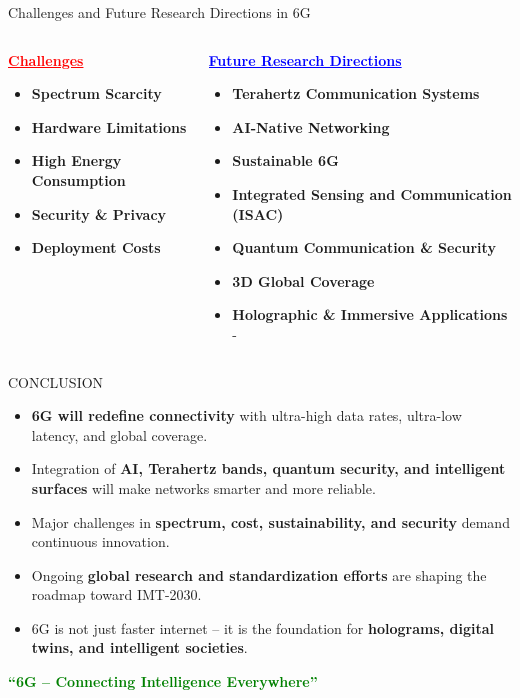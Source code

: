 \documentclass{beamer}
\begin{document}
\begin{frame}{Challenges and Future Research Directions in 6G}
\begin{columns}[T] 

\begin{column}{0.48\textwidth}
 \textcolor{red}{\underline{\textbf{Challenges}}}
\begin{itemize}
    \item \textbf{Spectrum Scarcity} 
    \item \textbf{Hardware Limitations} 
    \item \textbf{High Energy Consumption} 
    \item \textbf{Security \& Privacy} 
    \item \textbf{Deployment Costs} 
\end{itemize}
\end{column}

\begin{column}{0.48\textwidth}
 \textcolor{blue}{\underline{\textbf{Future Research Directions}}}
\begin{itemize}
    \item \textbf{Terahertz Communication Systems}
    \item \textbf{AI-Native Networking} 
    \item \textbf{Sustainable 6G} 
    \item \textbf{Integrated Sensing and Communication (ISAC)} 
    \item \textbf{Quantum Communication \& Security} 
    \item \textbf{3D Global Coverage} 
    \item \textbf{Holographic \& Immersive Applications} -
\end{itemize}
\end{column}
\end{columns}
\end{frame}

\begin{frame}{CONCLUSION}
\begin{itemize}
    \item \textbf{6G will redefine connectivity} with ultra-high data rates, ultra-low latency, and global coverage.
    \item Integration of \textbf{AI, Terahertz bands, quantum security, and intelligent surfaces} will make networks smarter and more reliable.
    \item Major challenges in \textbf{spectrum, cost, sustainability, and security} demand continuous innovation.
    \item Ongoing \textbf{global research and standardization efforts} are shaping the roadmap toward IMT-2030.
    \item 6G is not just faster internet -- it is the foundation for \textbf{holograms, digital twins, and intelligent societies}.
\end{itemize}

\vspace{0.4cm}
\centering
\textcolor{green}{\textbf{\Large ``6G – Connecting Intelligence Everywhere''}}
\end{frame}
\end{document}
